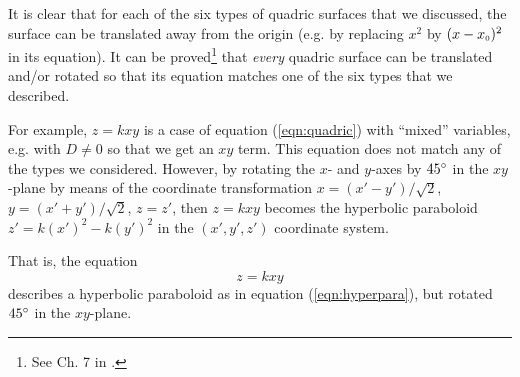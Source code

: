 It is clear that for each of the six types of quadric surfaces that we discussed, the surface can be translated away
from the origin (e.g. by replacing $x^2$ by $(x - x_{\scriptscriptstyle 0})^2$ in its equation). It can be proved\footnote{See
Ch. 7 in \cite{pog}.}
that \emph{every}
quadric surface can be translated and/or rotated so that its equation matches one of the six types that we described.

For example, $z = k xy$ is a case of equation (\ref{eqn:quadric}) with ``mixed'' variables, e.g. with $D \ne 0$ so
that we get an $xy$ term. 
This equation does not match any of the types we considered. 
However, by rotating the $x$-
and $y$-axes by $45^\circ$ in the $xy$-plane by means of the coordinate transformation
$x = (x' - y')/\sqrt{2}$, $y = (x' + y')/\sqrt{2}$, $z = z'$, then $z = kxy$ becomes
the hyperbolic paraboloid $z' = k(x')^2 - k(y')^2$ in the $(x',y',z')$ coordinate system. 

That is, the equation
\begin{equation}\label{eqn:hyperpara-xy}
z = kxy
\end{equation}
describes a hyperbolic paraboloid as in equation (\ref{eqn:hyperpara}), but rotated $45^\circ$ in the $xy$-plane.


